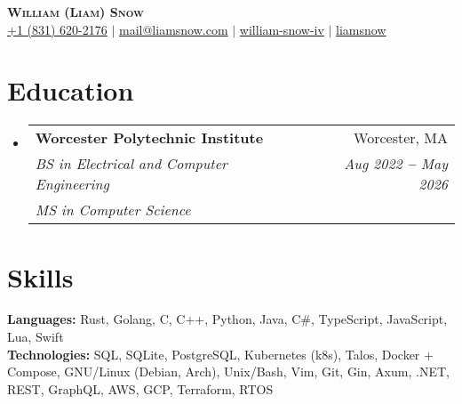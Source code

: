 \documentclass[12pt]{article}
\makeatletter
\newcommand{\entry}[1]{
  \item\small{
    {#1 \vspace{-2pt}}
  }
}
\newcommand{\educationheading}[6]{
  \vspace{-2pt}\item
    \begin{tabular*}{0.97\textwidth}[t]{l@{\extracolsep{\fill}}r}
      \textbf{#1} & #2 \\
      \textit{\small#3} & \textit{\small #4} \\
      \textit{\small#5} & \textit{\small #6} \\
    \end{tabular*}\vspace{-5pt}
}
\newcommand{\subheadingliststart}{\begin{itemize}[leftmargin=0.15in, label={}]}
\newcommand{\subheadinglistend}{\end{itemize}}
\makeatother
\begin{document}
\begin{center}
  \textbf{\Huge \scshape William (Liam) Snow} \\ \vspace{3pt}
    \small
    \faMobile \hspace{.5pt} \href{tel:8316202176}{+1 (831) 620-2176}
    $|$
    \faAt \hspace{.5pt} \href{mailto:mail@liamsnow.com}{mail@liamsnow.com}
    $|$
    \faLinkedinSquare \hspace{.5pt} \href{https://www.linkedin.com/in/william-snow-iv-140438169/}{william-snow-iv}
    $|$
    \faGithub \hspace{.5pt} \href{https://github.com/liamsnow}{liamsnow}
\end{center}

\section{Education}
  \vspace{3pt}
  \subheadingliststart
    \educationheading
      {Worcester Polytechnic Institute}{Worcester, MA}
      {BS in Electrical and Computer Engineering}{Aug 2022 \textbf{--} May 2026}
      {MS in Computer Science}{}
  \subheadinglistend

\section{Skills}
  \vspace{2pt}
  \subheadingliststart
    \small{\entry{
        \textbf{Languages:}{ Rust, Golang, C, C++, Python, Java, C\#, TypeScript, JavaScript, Lua, Swift } \\ \vspace{3pt}
        \textbf{Technologies:}{ SQL, SQLite, PostgreSQL, Kubernetes (k8s), Talos, Docker + Compose, GNU/Linux (Debian, Arch), Unix/Bash, Vim, Git, Gin, Axum, .NET, REST, GraphQL, AWS, GCP, Terraform, RTOS  } \\ \vspace{3pt}
    }}
  \subheadinglistend
\end{document}
